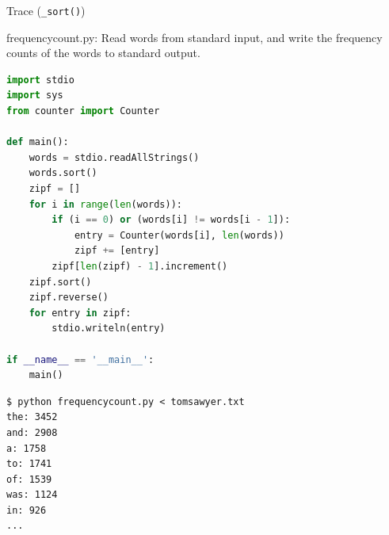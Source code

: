 \documentclass[8pt,a4paper,compress]{beamer}
\begin{document}
\begin{frame}[fragile]
\pause

Trace (\lstinline{_sort()})

\begin{center}
\end{center}
\end{frame}

\begin{frame}[fragile]
\pause

\begin{framed}
\tiny frequencycount.py: Read words from standard input, and write the frequency counts of the words to standard output.
\end{framed}

\begin{lstlisting}[language=Python]
import stdio
import sys
from counter import Counter

def main():
    words = stdio.readAllStrings()
    words.sort()
    zipf = []
    for i in range(len(words)):
        if (i == 0) or (words[i] != words[i - 1]):
            entry = Counter(words[i], len(words))
            zipf += [entry]
        zipf[len(zipf) - 1].increment()
    zipf.sort()
    zipf.reverse()
    for entry in zipf:
        stdio.writeln(entry)

if __name__ == '__main__':
    main()
\end{lstlisting}

\pause

\begin{lstlisting}[language={}]
$ python frequencycount.py < tomsawyer.txt
the: 3452
and: 2908
a: 1758
to: 1741
of: 1539
was: 1124
in: 926
...
\end{lstlisting}
\end{frame}
\end{document}
